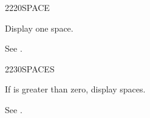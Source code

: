 \begin{worddef}{2220}{SPACE}
\item \stack{}{}

	Display one space.

	\begin{testing} %
		See .
	\end{testing}
\end{worddef}


\begin{worddef}{2230}{SPACES}
\item {}

	If  is greater than zero, display  spaces.

	\begin{testing} %
		See .
	\end{testing}
\end{worddef}


